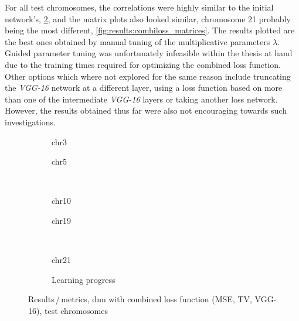 For all test chromosomes, the correlations were highly similar to the initial network's, \cref{fig:results:combilossDNN_pearson},
and the matrix plots also looked similar, chromosome 21 probably being the most different, \cref{fig:results:combiloss_matrices}.
The results plotted are the best ones obtained by manual tuning of the multiplicative parameters $\lambda$. 
Guided parameter tuning was unfortunately infeasible within the thesis at hand due to the training times required for optimizing the combined loss function.
Other options which where not explored for the same reason include truncating the \emph{VGG-16} network at a different layer, using a loss function based on
more than one of the intermediate \emph{VGG-16} layers \cite{Johnson2016} or taking another loss network.
However, the results obtained thus far were also not encouraging towards such investigations.
\begin{figure}[p] %
    \begin{subfigure}{0.45\textwidth}
        \scriptsize
        \caption{chr3}
    \end{subfigure} \hfill
    \begin{subfigure}{0.45\textwidth}
        \scriptsize
        \caption{chr5}
    \end{subfigure}\\[5mm]
    \begin{subfigure}{0.45\textwidth}
        \scriptsize
        \caption{chr10}
    \end{subfigure}\hfill
    \begin{subfigure}{0.45\textwidth}
        \scriptsize
        \caption{chr19}
    \end{subfigure}\\[3mm]
    \centering
    \begin{subfigure}{0.45\textwidth}
        \scriptsize
        \caption{chr21}
    \end{subfigure}\hfill
    \begin{subfigure}{0.45\textwidth}
        \caption{Learning progress} \label{fig:results:combilossDNN_lossEpochs}
    \end{subfigure}
    \caption{Results\,/\,metrics, \acrshort{dnn} with combined loss function (MSE, TV, VGG-16),  test chromosomes}
    \label{fig:results:combilossDNN_pearson}
\end{figure}
